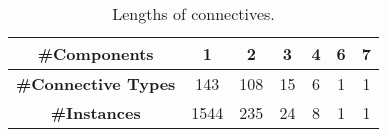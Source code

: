 \begin{table}[h]
\centering
\begin{tabular}{|c|c|c|c|c|c|c|}
\hline
\bf \#Components        & 1    & 2   & 3  & 4 & 6 & 7 \\ \hline
\bf \#Connective Types  & 143  & 108 & 15 & 6 & 1 & 1 \\ \hline
\bf \#Instances         & 1544 & 235 & 24 & 8 & 1 & 1 \\ \hline
\end{tabular}
\caption{\label{t:connective-length} Lengths of connectives.}
\end{table}
